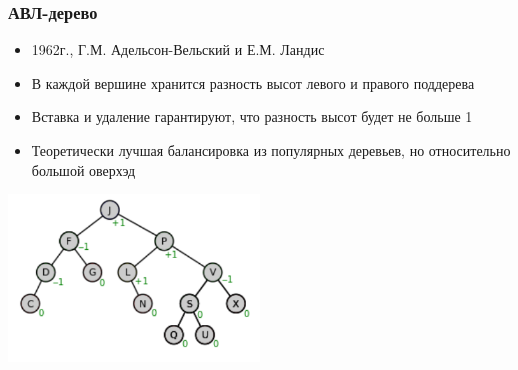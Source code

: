 \documentclass[xetex,mathserif,serif]{beamer}
\begin{document}
	\begin{frame}
		\frametitle{АВЛ-дерево}
		\begin{itemize}
			\item 1962г., Г.М. Адельсон-Вельский и Е.М. Ландис
			\item В каждой вершине хранится разность высот левого и правого поддерева
			\item Вставка и удаление гарантируют, что разность высот будет не больше 1
			\item Теоретически лучшая балансировка из популярных деревьев, но относительно большой оверхэд
		\end{itemize}
		\begin{center}
			\includegraphics[width=0.5\textwidth]{avl-tree.png}
		\end{center}
	\end{frame}
\end{document}
